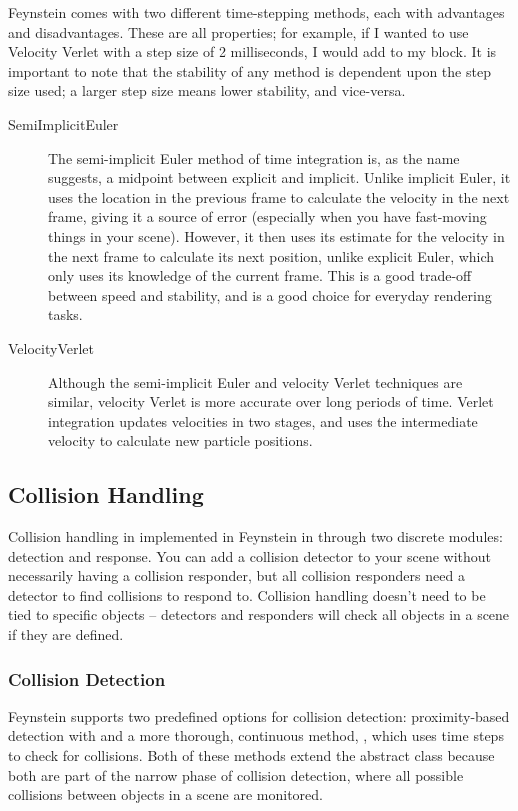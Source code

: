 Feynstein comes with two different time-stepping methods, each with
advantages and disadvantages. These are all properties; for example,
if I wanted to use Velocity Verlet with a step size of 2 milliseconds,
I would add  to my
 block. It is important to note that the stability of
any method is dependent upon the step size used; a larger step size
means lower stability, and vice-versa.

\begin{description}
\item[SemiImplicitEuler] The semi-implicit Euler method of time integration
  is, as the name suggests, a midpoint between explicit and
  implicit. Unlike implicit Euler, it uses the location in the
  previous frame to calculate the velocity in the next frame, giving
  it a source of error (especially when you have fast-moving things in
  your scene). However, it then uses its estimate for the velocity in
  the next frame to calculate its next position, unlike explicit
  Euler, which only uses its knowledge of the current frame. This is a
  good trade-off between speed and stability, and is a good choice for
  everyday rendering tasks.

\item[VelocityVerlet] Although the semi-implicit Euler and velocity
  Verlet techniques are similar, velocity Verlet is more accurate over
  long periods of time. Verlet integration updates velocities in two
  stages, and uses the intermediate velocity to calculate new particle
  positions.
\end{description}

\subsection{Collision Handling}
Collision handling in implemented in Feynstein in through two discrete
modules: detection and response. You can add a collision detector to
your scene without necessarily having a collision responder, but all
collision responders need a detector to find collisions to respond
to. Collision handling doesn't need to be tied to specific
objects -- detectors and responders will check all objects in a scene if
they are defined.

\subsubsection{Collision Detection}
Feynstein supports two predefined options for collision detection:
proximity-based detection with  and a more
thorough, continuous method, , which uses
time steps to check for collisions. Both of these methods extend the
abstract  class because both are part of the
narrow phase of collision detection, where all possible collisions
between objects in a scene are monitored.

